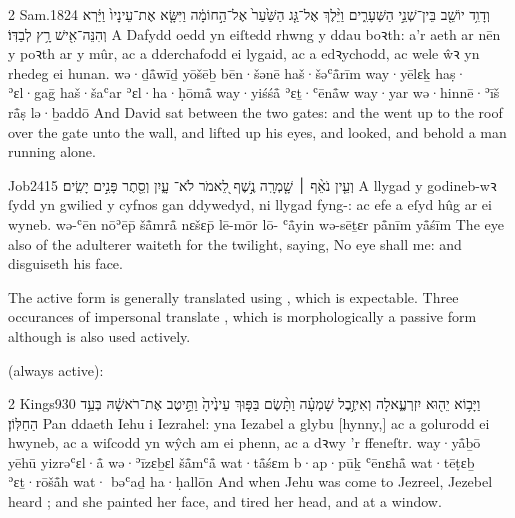 \begin{example}{2 Sam.}{18}{24}{}{}
	\quoling
	{וְדָוִ֥ד יוֹשֵׁ֖ב בֵּין־שְׁנֵ֣י הַשְּׁעָרִ֑ים וַיֵּ֨לֶךְ  אֶל־גַּ֤ג הַשַּׁ֙עַר֙ אֶל־הַ֣חוֹמָ֔ה וַיִּשָּׂ֤א אֶת־עֵינָיו֙ וַיַּ֔רְא וְהִנֵּה־אִ֖ישׁ רָ֥ץ לְבַדּֽוֹ׃}
	{A Dafydd oedd yn eiſtedd rhwng y ddau boꝛth: a’r  aeth ar nēn y poꝛth ar y mûr, ac a dderchafodd ei lygaid, ac a edꝛychodd, ac wele ŵꝛ yn rhedeg ei hunan.}
	{wə·ḏå̄wīḏ yōšēḇ bēn·šənē haš·šəʿå̄rīm way·yēlɛḵ haṣ· ʾɛl·gaḡ haš·šaʿar ʾɛl·ha·ḥōmå̄ way·yiśśå̄ ʾɛṯ·ʿēnå̄w way·yar wə·hinnē·ʾīš rå̄ṣ lə·ḇaddō}
	{And David sat between the two gates: and the  went up to the roof over the gate unto the wall, and lifted up his eyes, and looked, and behold a man running alone.}
\end{example}



\begin{example}{Job}{24}{15}{}{}
	\quoling
	{וְעֵ֤ין נֹאֵ֨ף ׀ שָׁ֤מְרָֽה נֶ֣שֶׁף לֵ֭אמֹר לֹא־ עָ֑יִן וְסֵ֖תֶר פָּנִ֣ים יָשִֽׂים׃}
	{A llygad y godineb-wꝛ ſydd yn gwilied y cyfnos gan ddywedyd, ni  llygad fyng-: ac efe a eſyd hûg ar ei wyneb.}
	{wə-ʿēn nōʾēp̄ šå̄mrå̄ nɛšɛp̄ lē-mōr lō- ʿå̄yin wə-sēṯɛr på̄nīm yå̄śīm}
	{The eye also of the adulterer waiteth for the twilight, saying, No eye shall  me: and disguiseth his face.}
\end{example}




\begin{paper}
	The active form  is generally translated using , which is expectable. Three occurances of impersonal  translate , which is morphologically a passive form although is also used actively.
\end{paper}

 (always active):
\begin{example}{2 Kings}{9}{30}{}{}
	\quoling
	{וַיָּב֥וֹא יֵה֖וּא יִזְרְעֶ֑אלָה וְאִיזֶ֣בֶל שָׁמְעָ֗ה וַתָּ֨שֶׂם בַּפּ֤וּךְ עֵינֶ֙יהָ֙ וַתֵּ֣יטֶב אֶת־רֹאשָׁ֔הּ  בְּעַ֥ד הַחַלּֽוֹן׃}
	{Pan ddaeth Iehu i Iezrahel: yna Iezabel a glybu [hynny,] ac a golurodd ei hwyneb, ac a wiſcodd yn wŷch am ei phenn, ac a  dꝛwy ’r ffeneſtr.}
	{way·yå̄ḇō yēhū yizrəʿɛl·å̄ wə·ʾīzɛḇɛl šå̄mʿå̄ wat·tå̄śɛm b·ap·pūḵ ʿēnɛhå̄ wat·tēṭɛḇ ʾɛṯ·rōšå̄h wat· bəʿaḏ ha·ḥallōn}
	{And when Jehu was come to Jezreel, Jezebel heard ; and she painted her face, and tired her head, and  at a window.}
\end{example}

